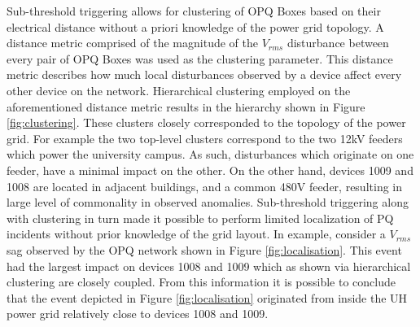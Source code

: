 Sub-threshold triggering allows for clustering of OPQ Boxes based on their electrical distance without a priori knowledge of the power grid topology.
A distance metric comprised of the magnitude of the $V_{rms}$  disturbance between every pair of OPQ Boxes was used as the clustering parameter.
This distance metric describes how much local disturbances observed by a device affect every other device on the network.
Hierarchical clustering employed on the aforementioned distance metric results in the hierarchy shown in Figure \ref{fig:clustering}.
These clusters closely corresponded to the topology of the power grid.
For example the two top-level clusters correspond to the two 12kV feeders which power the university campus.
As such, disturbances which originate on one feeder, have a minimal impact on the other.
On the other hand, devices 1009 and 1008 are located in adjacent buildings, and a common 480V feeder, resulting in large level of commonality in observed anomalies.
Sub-threshold triggering along with clustering in turn made it possible to perform limited localization of PQ incidents without prior knowledge of the grid layout.
In example, consider a $V_{rms}$ sag observed by the OPQ network shown in Figure \ref{fig:localisation}.
This event had the largest impact on devices 1008 and 1009 which as shown via hierarchical clustering are closely coupled.
From this information it is possible to conclude that the event depicted in Figure \ref{fig:localisation} originated from inside the UH power grid relatively close to devices 1008 and 1009.

